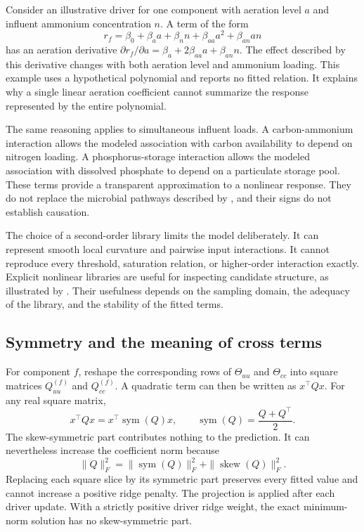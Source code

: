 Consider an illustrative driver for one component with aeration level \(a\) and influent ammonium concentration \(n\). A term of the form
\begin{equation}
\label{eq:icsor_example_driver}
r_f=\beta_0+\beta_a a+\beta_n n+\beta_{aa}a^2+\beta_{an}an
\end{equation}
has an aeration derivative \(\partial r_f/\partial a=\beta_a+2\beta_{aa}a+\beta_{an}n\). The effect described by this derivative changes with both aeration level and ammonium loading. This example uses a hypothetical polynomial and reports no fitted relation. It explains why a single linear aeration coefficient cannot summarize the response represented by the entire polynomial.

The same reasoning applies to simultaneous influent loads. A carbon-ammonium interaction allows the modeled association with carbon availability to depend on nitrogen loading. A phosphorus-storage interaction allows the modeled association with dissolved phosphate to depend on a particulate storage pool. These terms provide a transparent approximation to a nonlinear response. They do not replace the microbial pathways described by \citet{Henze1999}, and their signs do not establish causation.

The choice of a second-order library limits the model deliberately. It can represent smooth local curvature and pairwise input interactions. It cannot reproduce every threshold, saturation relation, or higher-order interaction exactly. Explicit nonlinear libraries are useful for inspecting candidate structure, as illustrated by \citet{Brunton2016}. Their usefulness depends on the sampling domain, the adequacy of the library, and the stability of the fitted terms.

\subsection{Symmetry and the meaning of cross terms}

For component \(f\), reshape the corresponding rows of \(\Theta_{uu}\) and \(\Theta_{cc}\) into square matrices \(Q_{uu}^{(f)}\) and \(Q_{cc}^{(f)}\). A quadratic term can then be written as \(x^\top Qx\). For any real square matrix,
\begin{equation}
\label{eq:icsor_quadratic_symmetry}
x^\top Qx=x^\top\operatorname{sym}(Q)x,
\qquad
\operatorname{sym}(Q)=\frac{Q+Q^\top}{2}.
\end{equation}
The skew-symmetric part contributes nothing to the prediction. It can nevertheless increase the coefficient norm because
\begin{equation}
\label{eq:icsor_quadratic_norm}
\|Q\|_F^2=
\|\operatorname{sym}(Q)\|_F^2+
\|\operatorname{skew}(Q)\|_F^2.
\end{equation}
Replacing each square slice by its symmetric part preserves every fitted value and cannot increase a positive ridge penalty. The projection is applied after each driver update. With a strictly positive driver ridge weight, the exact minimum-norm solution has no skew-symmetric part.

